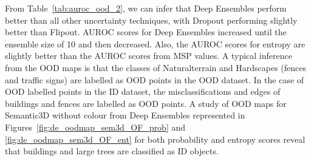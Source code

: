     From Table~\ref{tab:auroc_ood_2}, we can infer that Deep Ensembles perform better than all other uncertainty techniques, with Dropout performing slightly better than Flipout.
    AUROC scores for Deep Ensembles increased until the ensemble size of 10 and then decreased.
    Also, the AUROC scores for entropy are slightly better than the AUROC scores from MSP values.
    A typical inference from the OOD maps is that the classes of Naturalterrain and Hardscapes (fences and traffic signs) are labelled as OOD points in the OOD dataset.
    In the case of OOD labelled points in the ID dataset, the misclassifications and edges of buildings and fences are labelled as OOD points.
    A study of OOD maps for Semantic3D without colour from Deep Ensembles represented in Figures~\ref{fig:de_oodmap_sem3d_OF_prob} and \ref{fig:de_oodmap_sem3d_OF_ent} for both probability and entropy scores reveal that buildings and large trees are classified as ID objects.
